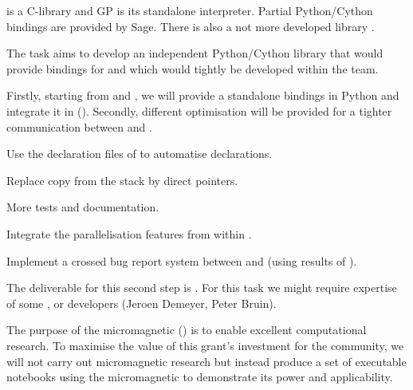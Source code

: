 \begin{workpackage}
\begin{tasklist}
\begin{task}[lead=UB,title=Python/Cython bindings for \Pari,PM=16,id=pari-python,partners={UB,UG},wphases=0-48,issue=80]
  \Pari is a C-library and GP is its standalone interpreter. Partial
  Python/Cython bindings are provided by Sage. There is also a not
  more developed library .

  The task aims to develop an independent Python/Cython library that
  would provide bindings for \PariGP and which would tightly be
  developed within the \PariGP team.

  Firstly, starting from \Sage and , we will provide a standalone \Pari bindings in Python
  and integrate it in \Sage (). Secondly, different optimisation
  will be provided for a tighter communication between \Pari and \Python.
  \begin{compactitem}
  \item Use the declaration files of  to automatise \Cython declarations.
  \item Replace copy from the \Pari stack by direct pointers.
  \item More tests and documentation.
  \item Integrate the parallelisation features from  within \Python.
  \item Implement a crossed bug report system between \Sage and \Pari (using
  results of ).
  \end{compactitem}
  The deliverable for this second step is . For this task we might
  require expertise of some \Sage, \Pari or \Cython developers (Jeroen Demeyer, Peter Bruin).
\end{task}

\begin{task}[lead=XFEL,title=Demonstrator: micromagnetic VRE notebooks,
  id=oommf-tutorial-and-documentation,PM=6,partners={SR,PS,USO},wphases=19-25,issue=81]
  The purpose of the micromagnetic \VRE
  () is to enable excellent
  computational research. To maximise the value of this grant's
  investment for the community, we will not carry out micromagnetic
  research but instead produce a set of executable notebooks using the
  micromagnetic \VRE to demonstrate its power and applicability.


\end{task}
\end{tasklist}
\end{workpackage}
